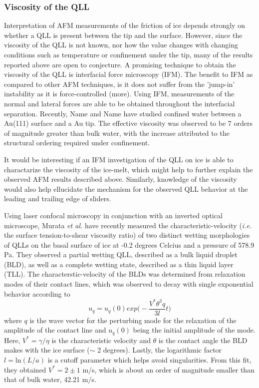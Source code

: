 \subsubsection{Viscosity of the QLL}
 Interpretation of AFM measurements of the friction of ice depends
 strongly on whether a QLL is present between the tip and the
 surface. However, since the viscosity of the QLL is not known, nor
 how the value changes with changing conditions such as temperature or
 confinement under the tip, many of the results reported above are
 open to conjecture. A promising technique to obtain the viscosity of
 the QLL is interfacial force microscopy (IFM). The benefit to IFM as
 compared to other AFM techniques, is it does not suffer from the
 'jump-in' instability as it is  force-controlled (more). Using IFM,
 measurements of the normal and lateral forces are able to be obtained
 throughout the interfacial separation.\cite{Joyce1991} Recently, Name and
 Name have studied confined water between a Au(111) surface and a Au
 tip.\cite{Major2006} The effective viscosity was observed to be 7 orders of
 magnitude greater than bulk water, with the increase attributed to
 the structural ordering required under confinement. 

 It would be interesting if an IFM investigation of the QLL on ice is
 able to charactarize the viscosity of the ice-melt, which might help
 to further explain the observed AFM results described
 above. Similarly, knowledge of the viscosity would also help
 ellucidate the mechanism for the observed QLL behavior at the leading
 and trailing edge of sliders.



Using laser confocal microscopy in conjunction with an inverted
optical microscope, Murata \textit{et al.} have recently measured the
characteristic-velocity (\textit{i.e.} the surface tension-to-shear
viscosity ratio) of two distinct wetting morphologies of QLLs on the
basal surface of ice at -0.2 degrees Celcius and a pressure of 578.9
Pa.\cite{Murata2015} They observed a partial wetting QLL, described as
a bulk liquid droplet (BLD), as well as a complete wetting state,
described as a thin liquid layer (TLL). The characterstic-velocity of
the BLDs was determined from relaxation modes of their contact lines,
which was observed to decay with single exponential behavior according
to
\begin{equation}
u_q = u_q(0) exp\Bigg(-\frac{V^* \theta^3 q}{3l}t\Bigg)
\end{equation}
where $q$ is the wave vector for the perturbing mode for the
relaxation of the amplitude of the contact line and $u_q(0)$ being the
initial amplitude of the mode. Here, $V^* = \gamma / \eta$ is the
characteristic velocity and $\theta$ is the contact angle the BLD makes
with the ice surface ($\sim$ 2 degrees). Lastly, the logarithmic factor
$l=\mathrm{ln}(L/a)$ is a cutoff parameter which helps avoid
singularities. From this fit, they obtained $V^* = 2 \pm 1$ m/s, which
is about an order of magnitude smaller than that of bulk water, 42.21
m/s.

